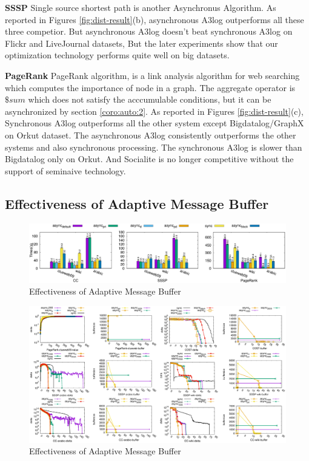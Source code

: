 \textbf{SSSP} Single source shortest path is another Asynchronus Algorithm. As reported in Figures \ref{fig:dist-result}(b), asynchronous A3log outperforms all these three competior. But asynchronous A3log doesn't beat synchronous A3log on Flickr and LiveJournal datasets, But the later experiments show that our optimization technology performs quite well on big datasets.

\textbf{PageRank} PageRank algorithm, is a link analysis algorithm for web searching which computes the importance of node in a graph. The aggregate operator is $\$sum$ which does not satisfy the acccumulable conditions, but it can be  asynchronized by section \ref{coro:auto:2}. As reported in Figures \ref{fig:dist-result}(c), Synchronous A3log outperforms all the other system except Bigdatalog/GraphX on Orkut dataset. The asynchronous A3log consistently outperforms the other systems and also synchronous processing. The synchronous A3log is slower than Bigdatalog only on Orkut. And Socialite is no longer competitive without the support of seminaive technology.

\subsection{Effectiveness of Adaptive Message Buffer}
\label{sec:expr:AMBuffer}
\begin{figure}[!t]
	\vspace{0.0in}
	\centering
	\includegraphics[width=7.0in]{figuration/summary.eps}
	\vspace{-0.1in}
	\caption{Effectiveness of Adaptive Message Buffer}
	\label{fig:summary}
	\vspace{-0.1in}
\end{figure}
\begin{figure}[!t]
	\centering
	\includegraphics[width=7.0in]{figuration/combine.eps}
	\vspace{-0.1in}
	\caption{Effectiveness of Adaptive Message Buffer}
	\label{fig:details}
	\vspace{-0.1in}
\end{figure}




